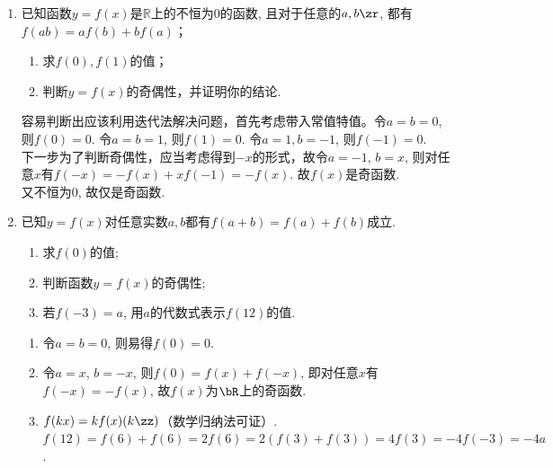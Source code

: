 \begin{enumerate}
\begin{vspace_}
   \vsp[5] 
\end{vspace_}


\item 已知函数$y=f(x)$是$\mathbb{R}$上的不恒为0的函数, 且对于任意的$a,b\zr$, 都有$f(ab)=af(b)+bf(a)$；
\begin{enumerate}
    \item 求$f(0), f(1)$的值；
    \item 判断$y=f(x)$的奇偶性，并证明你的结论. 
\end{enumerate}
\begin{jieda}
容易判断出应该利用迭代法解决问题，首先考虑带入常值特值。令$a=b=0$, 则$f(0)=0$. 令$a=b=1$, 则$f(1)=0$. 令$a=1, b=-1$, 则$f(-1)=0$. \\
下一步为了判断奇偶性，应当考虑得到$-x$的形式，故令$a=-1$, $b=x$, 则对任意$x$有$f(-x)=-f(x)+xf(-1)=-f(x)$. 故$f(x)$是奇函数. \\
又不恒为0, 故仅是奇函数. 
\end{jieda}

\begin{vspace_}
   \vsp[5] 
\end{vspace_}

\item 已知$y=f(x)$对任意实数$a,b$都有$f(a+b)=f(a)+f(b)$成立. 
\begin{enumerate}[(1)]
\item 求$f(0)$的值; 
\item 判断函数$y=f(x)$的奇偶性; 
\item 若$f(-3)=a$, 用$a$的代数式表示$f(12)$的值. 
\end{enumerate}
\begin{jieda}
\begin{enumerate}
\item 令$a=b=0$, 则易得$f(0)=0$. 
\item 令$a=x$, $b=-x$, 则$f(0)=f(x)+f(-x)$, 即对任意$x$有$f(-x)=-f(x)$, 故$f(x)$为$\bR$上的奇函数. 
\item $f(kx)=kf(x)(k\zz)$（数学归纳法可证）. \\
$f(12)=f(6)+f(6)=2f(6)=2(f(3)+f(3))=4f(3)=-4f(-3)=-4a$. 
\end{enumerate}
\end{jieda}

\begin{vspace_}
   \vsp[5] 
\end{vspace_}



\end{enumerate}
